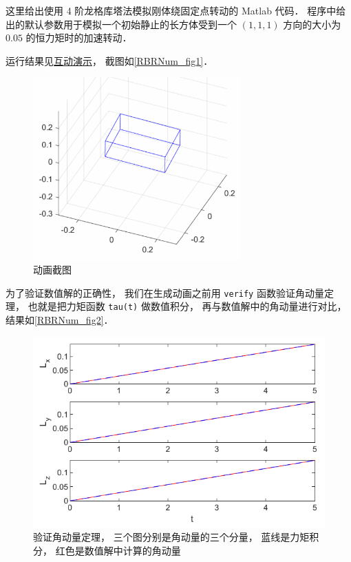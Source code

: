 

这里给出使用 4 阶龙格库塔法模拟刚体绕固定点转动的 Matlab 代码． 程序中给出的默认参数用于模拟一个初始静止的长方体受到一个 $(1,1,1)$ 方向的大小为 $0.05$ 的恒力矩时的加速转动．

运行结果见\href{http://wuli.wiki/apps/rigBdRot.html}{互动演示}， 截图如\autoref{RBRNum_fig1}．

\begin{figure}[ht]
\centering
\includegraphics[width=8cm]{./figures/RBRNum_1.png}
\caption{动画截图} \label{RBRNum_fig1}
\end{figure}

为了验证数值解的正确性， 我们在生成动画之前用 \lstinline|verify| 函数验证角动量定理， 也就是把力矩函数 \lstinline|tau(t)| 做数值积分， 再与数值解中的角动量进行对比， 结果如\autoref{RBRNum_fig2}．
\begin{figure}[ht]
\centering
\includegraphics[width=12cm]{./figures/RBRNum_1.pdf}
\caption{验证角动量定理， 三个图分别是角动量的三个分量， 蓝线是力矩积分， 红色是数值解中计算的角动量} \label{RBRNum_fig2}
\end{figure}

